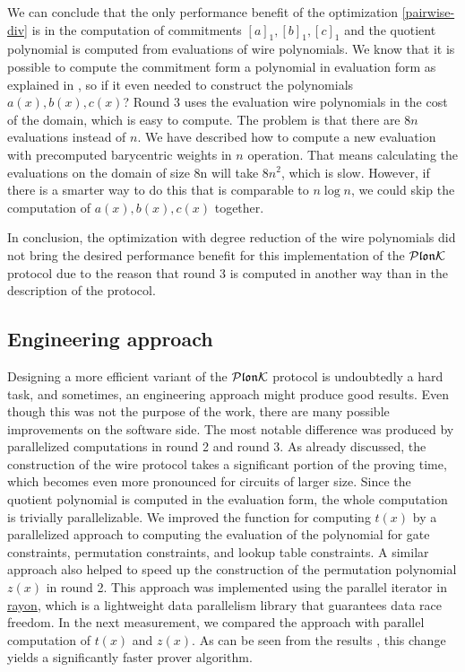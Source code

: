 We can conclude that the only performance benefit of the optimization \ref{pairwise-div} is in the computation of commitments $[a]_1, [b]_1, [c]_1$ and the quotient polynomial is computed from evaluations of wire polynomials. We know that it is possible to compute the commitment form a polynomial in evaluation form as explained in , so if it even needed to construct the polynomials $a(x), b(x), c(x)$? Round 3 uses the evaluation wire polynomials in the cost of the domain, which is easy to compute. The problem is that there are $8n$ evaluations instead of $n$. We have described how to compute a new evaluation with precomputed barycentric weights in $n$ operation. That means calculating the evaluations on the domain of size 8n will take $8n^2$, which is slow. However, if there is a smarter way to do this that is comparable to $n \log{n}$, we could skip the computation of $ a(x), b(x), c(x)$ together. 

In conclusion, the optimization with degree reduction of the wire polynomials did not bring the desired performance benefit for this implementation of the $\mathcal{P}\mathfrak{lon}\mathcal{K}$ protocol due to the reason that round 3 is computed in another way than in the description of the protocol. 

\subsection{Engineering approach}
Designing a more efficient variant of the $\mathcal{P}\mathfrak{lon}\mathcal{K}$ protocol is undoubtedly a hard task, and sometimes, an engineering approach might produce good results. Even though this was not the purpose of the work, there are many possible improvements on the software side. The most notable difference was produced by parallelized computations in round 2 and round 3. As already discussed, the construction of the wire protocol takes a significant portion of the proving time, which becomes even more pronounced for circuits of larger size. Since the quotient polynomial is computed in the evaluation form, the whole computation is trivially parallelizable. We improved the function for computing $t(x)$ by a parallelized approach to computing the evaluation of the polynomial for gate constraints, permutation constraints, and lookup table constraints. A similar approach also helped to speed up the construction of the permutation polynomial $z(x)$ in round 2. This approach was implemented using the parallel iterator in \href{https://github.com/rayon-rs/rayon}{rayon}, which is a lightweight data parallelism library that guarantees data race freedom. In the next measurement, we compared the approach  with parallel computation of $t(x)$ and $z(x)$. As can be seen from the results , this change yields a significantly faster prover algorithm. 

